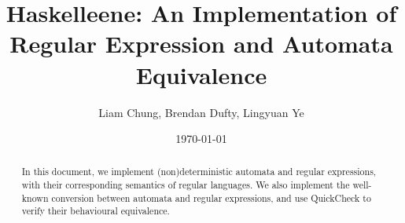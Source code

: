 \documentclass[12pt]{article}
\title{Haskelleene: An Implementation of Regular Expression and Automata Equivalence}
\author{Liam Chung, Brendan Dufty, Lingyuan Ye}
\date{\today}
\begin{document}
\maketitle

\begin{abstract}
  In this document, we implement (non)deterministic automata and regular expressions, with their corresponding semantics of regular languages. We also implement the well-known conversion between automata and regular expressions, and use QuickCheck to verify their behavioural equivalence.
\end{abstract}

\vfill

\tableofcontents

\clearpage


% 















\end{document}

